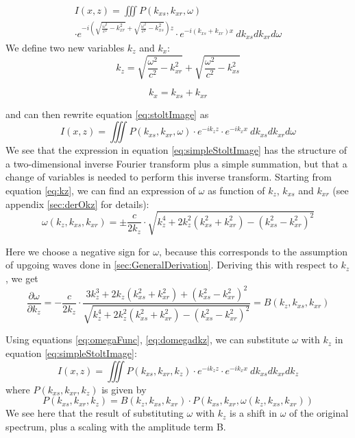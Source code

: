 \documentclass{article}%
\begin{document}
\begin{multline}
	I(x,z) = \iiint P(k_{xs},k_{xr},\omega) \\
		\cdot e^{-i \left( \sqrt{\frac{\omega^2}{c^2} - k_{xr}^2} + \sqrt{\frac{\omega^2}{c^2} - k_{xs}^2} \right) z} 
		\cdot e^{-i\left(k_{xs} + k_{xr} \right) x} \ dk_{xs} dk_{xr} d\omega
\label{eq:stoltImage}
\end{multline}
We define two new variables $k_z$ and $k_x$:
\begin{equation}
	k_z = \sqrt{\frac{\omega^2}{c^2} - k_{xr}^2} + \sqrt{\frac{\omega^2}{c^2} - k_{xs}^2}
\label{eq:kz}
\end{equation}

\begin{equation}	 
	k_x = k_{xs} + k_{xr}
\label{eq:kx}
\end{equation}

and can then rewrite equation \ref{eq:stoltImage} as
\begin{equation}
	I(x,z) = \iiint P(k_{xs},k_{xr},\omega)
		\cdot e^{-i k_z z} \cdot e^{-i k_x x} \ dk_{xs} dk_{xr} d\omega
\label{eq:simpleStoltImage}
\end{equation}
We see that the expression in equation \ref{eq:simpleStoltImage} has the structure of a two-dimensional inverse Fourier transform plus a simple summation, but that a change of variables is needed to perform this inverse transform. Starting from equation \ref{eq:kz}, we can find an expression of $\omega$ as function of $k_z$, $k_{xs}$ and $k_{xr}$ (see appendix \ref{sec:derOkz} for details):
\begin{equation}
	\omega(k_z,k_{xs},k_{xr}) = \pm \frac{c}{2k_z} \cdot \sqrt{k_z^4 + 2k_z^2(k_{xs}^2 + k_{xr}^2) - (k_{xs}^2-k_{xr}^2)^2}
\label{eq:omegaFunc}
\end{equation}

Here we choose a negative sign for $\omega$, because this corresponds to the assumption of upgoing waves done in \ref{sec:GeneralDerivation}. Deriving this with respect to $k_z$, we get
\begin{equation}
	\frac{\partial \omega}{\partial k_z} = 
		- \frac{c}{2k_z} \cdot \frac{3k_z^3 + 2k_z(k_{xs}^2 + k_{xr}^2) + (k_{xs}^2-k_{xr}^2)^2}
			{\sqrt{k_z^4 + 2k_z^2(k_{xs}^2 + k_{xr}^2) - (k_{xs}^2-k_{xr}^2)^2}} = B(k_z,k_{xs},k_{xr})
\label{eq:domegadkz}
\end{equation}

Using equations \ref{eq:omegaFunc}, \ref{eq:domegadkz}, we can substitute $\omega$ with $k_z$ in equation \ref{eq:simpleStoltImage}:
\begin{equation}
	I(x,z) = \iiint P(k_{xs},k_{xr},k_z)
		\cdot e^{-i k_z z} \cdot e^{-i k_x x} \ dk_{xs} dk_{xr} dk_z
\label{eq:imageSubOmega}
\end{equation}
where $P(k_{xs},k_{xr},k_z)$ is given by
\begin{equation}
	P(k_{xs},k_{xr},k_z) = B(k_z,k_{xs},k_{xr}) \cdot P(k_{xs},k_{xr},\omega(k_z,k_{xs},k_{xr}))
\label{eq:}
\end{equation}
We see here that the result of substituting $\omega$ with $k_z$ is a shift in $\omega$ of the original spectrum, plus a scaling with the amplitude term B.
\end{document}
